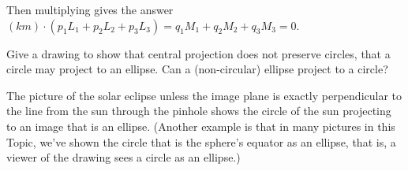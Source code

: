 \begin{exercises}
\begin{answer}
      Then multiplying gives the answer
      $(km)\cdot (p_1L_1+p_2L_2+p_3L_3)=q_1M_1+q_2M_2+q_3M_3=0$.
    \end{answer}
  \item 
    Give a drawing to show that central projection does not preserve 
    circles, that a circle may project to an ellipse.
    Can a (non-circular) ellipse project to a circle?
    \begin{answer}
      The picture of the solar eclipse \Dash  unless 
      the image plane is exactly perpendicular
      to the line from the sun through the pinhole \Dash  shows the circle
      of the sun projecting to an image that is an  ellipse.
      (Another example is that in many pictures in this 
      Topic, we've shown the circle that is the sphere's equator as an ellipse,
      that is, a viewer of the drawing sees a circle as an ellipse.)
      

\end{answer}
\end{exercises}
